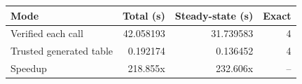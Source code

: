 {\small
\begin{tabular}{lrrr}
\hline
Mode & Total (s) & Steady-state (s) & Exact \\
\hline
Verified each call & 42.058193 & 31.739583 & 4 \\
Trusted generated table & 0.192174 & 0.136452 & 4 \\
Speedup & 218.855x & 232.606x & -- \\
\hline
\end{tabular}
}
